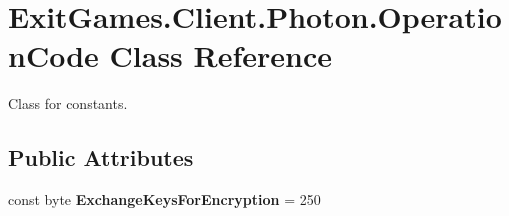 \hypertarget{class_exit_games_1_1_client_1_1_photon_1_1_operation_code}{}\section{Exit\+Games.\+Client.\+Photon.\+Operation\+Code Class Reference}
\label{class_exit_games_1_1_client_1_1_photon_1_1_operation_code}


Class for constants.  


\subsection*{Public Attributes}
\begin{DoxyCompactItemize}
\item 
const byte {\bfseries Exchange\+Keys\+For\+Encryption} = 250\hypertarget{class_exit_games_1_1_client_1_1_photon_1_1_operation_code_afa955a532c6293b315db995fc1cadd4a}{}\label{class_exit_games_1_1_client_1_1_photon_1_1_operation_code_afa955a532c6293b315db995fc1cadd4a}


\end{DoxyCompactItemize}
